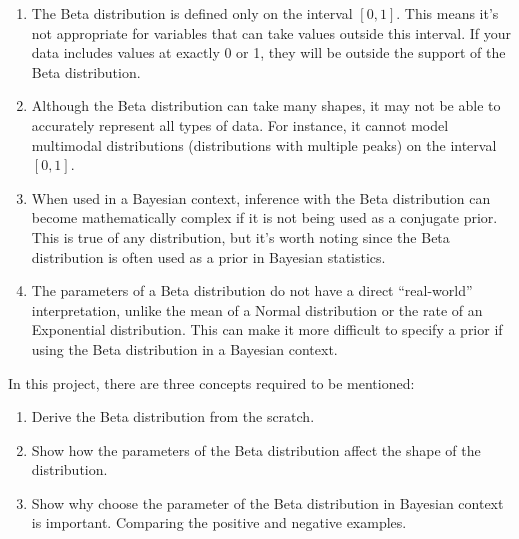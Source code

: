 \documentclass{article}
\begin{document}
\begin{enumerate}
    \item The Beta distribution is defined only on the interval $[0, 1]$. This means it's not appropriate for variables that can take values outside this interval. If your data includes values at exactly 0 or 1, they will be outside the support of the Beta distribution.
    \item Although the Beta distribution can take many shapes, it may not be able to accurately represent all types of data. For instance, it cannot model multimodal distributions (distributions with multiple peaks) on the interval $[0, 1]$.
    \item When used in a Bayesian context, inference with the Beta distribution can become mathematically complex if it is not being used as a conjugate prior. This is true of any distribution, but it's worth noting since the Beta distribution is often used as a prior in Bayesian statistics.
    \item The parameters of a Beta distribution do not have a direct ``real-world'' interpretation, unlike the mean of a Normal distribution or the rate of an Exponential distribution. This can make it more difficult to specify a prior if using the Beta distribution in a Bayesian context.
\end{enumerate}

In this project, there are three concepts required to be mentioned:
\begin{enumerate}
    \item Derive the Beta distribution from the scratch.
    \item Show how the parameters of the Beta distribution affect the shape of the distribution.
    \item Show why choose the parameter of the Beta distribution in Bayesian context is important. Comparing the positive and negative examples.
\end{enumerate}
\end{document}
